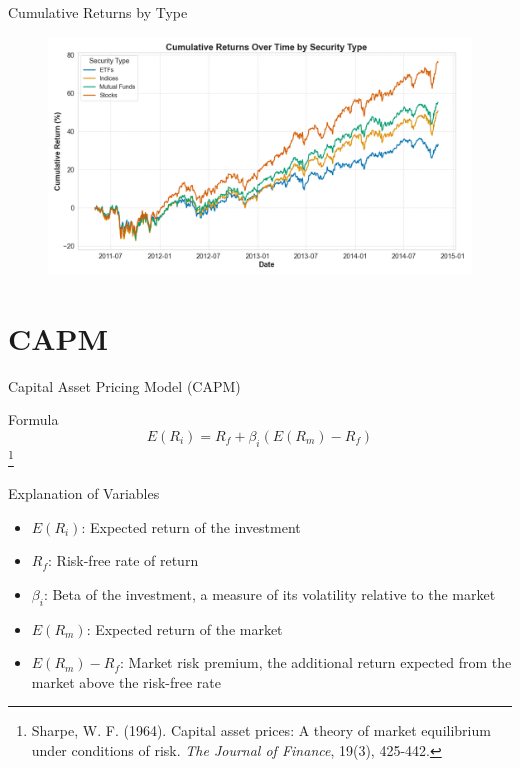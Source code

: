 \documentclass{beamer}
\begin{document}
\begin{frame}{Cumulative Returns by Type}
    \begin{figure}
        \centering
        \includegraphics[width=\linewidth]{cumulative_returns_by_type.png}
    \end{figure}
\end{frame}







\section{CAPM}
\begin{frame}{Capital Asset Pricing Model (CAPM)}
    \begin{block}{Formula} 
        \begin{equation*}
            E(R_i) = R_f + \beta_i (E(R_m) - R_f)
        \end{equation*}
        \footnote{Sharpe, W. F. (1964). Capital asset prices: A theory of market equilibrium under conditions of risk. \textit{The Journal of Finance}, 19(3), 425-442.}
    \end{block}
    \begin{block}{Explanation of Variables}
        \begin{itemize}
            \item \( E(R_i) \): Expected return of the investment
            \item \( R_f \): Risk-free rate of return
            \item \( \beta_i \): Beta of the investment, a measure of its volatility relative to the market
            \item \( E(R_m) \): Expected return of the market
            \item \( E(R_m) - R_f \): Market risk premium, the additional return expected from the market above the risk-free rate
        \end{itemize}
    \end{block}
\end{frame}
\end{document}
